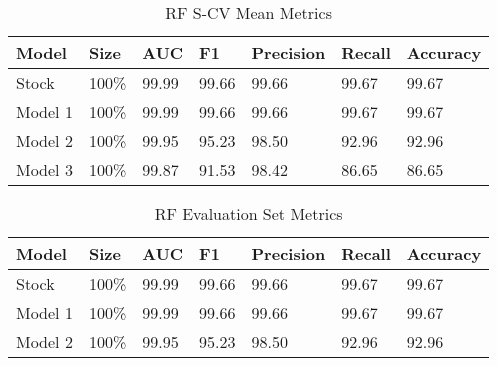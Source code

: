 

\begin{table}[h]
\centering
\caption{RF S-CV Mean Metrics}
\label{tab:rf-scv-metrics}
\begin{tabular}{|l|l|l|l|l|l|l|}
\hline
\textbf{Model} & \textbf{Size} & \textbf{AUC} & \textbf{F1} & \textbf{Precision} & \textbf{Recall} & \textbf{Accuracy}  \\ \hline
Stock & 100\% & 99.99 & 99.66 & 99.66 & 99.67 & 99.67 \\ \hline
Model 1 & 100\% & 99.99 & 99.66 & 99.66 & 99.67 & 99.67 \\ \hline
Model 2 & 100\% & 99.95 & 95.23 & 98.50 & 92.96 & 92.96 \\ \hline
Model 3 & 100\% & 99.87 & 91.53 & 98.42 & 86.65 & 86.65 \\ \hline
\end{tabular}
\end{table}


\begin{table}[h]
\centering
\caption{RF Evaluation Set Metrics}
\label{tab:rf-eval-metrics}
\begin{tabular}{|l|l|l|l|l|l|l|}
\hline
\textbf{Model} & \textbf{Size} & \textbf{AUC} & \textbf{F1} & \textbf{Precision} & \textbf{Recall} & \textbf{Accuracy}  \\ \hline
Stock & 100\% & 99.99 & 99.66 & 99.66 & 99.67 & 99.67 \\ \hline
Model 1 & 100\% & 99.99 & 99.66 & 99.66 & 99.67 & 99.67 \\ \hline
Model 2 & 100\% & 99.95 & 95.23 & 98.50 & 92.96 & 92.96 \\ \hline
\end{tabular}
\end{table}



